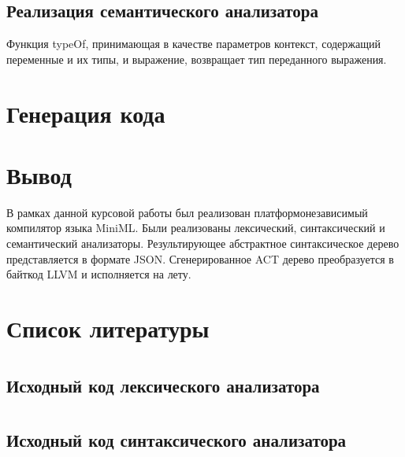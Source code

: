 \documentclass[a4paper,12pt]{article}
\numberwithin{equation}{section}
\begin{document}
\subsection{Реализация семантического анализатора}
Функция typeOf, принимающая в качестве параметров контекст,
содержащий переменные и их типы, и выражение, возвращает тип
переданного выражения.

\section{Генерация кода}


\section{Вывод}
В рамках данной курсовой работы был реализован платформонезависимый компилятор
языка MiniML. Были реализованы лексический, синтаксический и
семантический анализаторы. Результирующее абстрактное синтаксическое
дерево представляется в формате JSON. Сгенерированное ACT дерево преобразуется
в байткод LLVM и исполняется на лету.

\section{Список литературы}
\printbibliography[heading=none]

\section*{}
\subsection*{Исходный код лексического анализатора}

\clearpage

\section*{}
\subsection*{Исходный код синтаксического анализатора}

\clearpage

\section*{}
\end{document}
